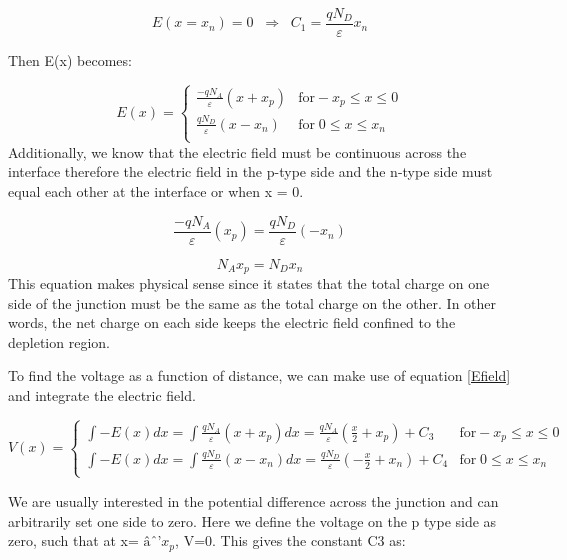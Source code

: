 \begin{equation}
E(x=x_{n})=0  \; \;  \Rightarrow  \;\; C_{1}= \frac{qN_{D}}{\varepsilon}x_{n}
\end{equation}

Then E(x) becomes:

\begin{equation}
E(x) = \begin{cases}
         \frac{-qN_{A}}{\varepsilon}(x+x_{p}) & \text{for}  -x_{p}\leq x \leq 0 \\
         \frac{qN_{D}}{\varepsilon}(x-x_{n})  &  \text{for} \; 0 \leq x \leq x_{n}  \\
     \end{cases}
\end{equation}
 Additionally, we know that the electric field must be continuous across the interface therefore the electric field in the p-type side and the n-type side must equal each other at the interface or when x = 0. 

\begin{equation}
\frac{-qN_{A}}{\varepsilon}(x_{p})=\frac{qN_{D}}{\varepsilon}(-x_{n})
\end{equation}

\begin{equation}
N_{A}x_{p}=N_{D}x_{n}
\label{NAeqND}
\end{equation}This equation makes physical sense since it states that the total charge on one side of the junction must be the same as the total charge on the other. In other words, the net charge on each side keeps the electric field confined to the depletion region.

To find the voltage as a function of distance, we can make use of equation \ref{Efield} and integrate the electric field.

\begin{equation}
V(x) = \begin{cases}
       \int -E(x)dx=\int \frac{qN_{A}}{\varepsilon}(x+x_{p}) dx = \frac{qN_{A}}{\varepsilon}(\frac{x}{2}+x_{p})+ C_{3} & \text{for}  -x_{p}\leq x \leq 0 \\
       \int -E(x)dx=\int \frac{qN_{D}}{\varepsilon}(x-x_{n}) dx = \frac{qN_{D}}{\varepsilon}(-\frac{x}{2}+x_{n})+ C_{4}  &  \text{for} \; 0 \leq x \leq x_{n}  \\
     \end{cases}
\end{equation}

We are usually interested in the potential difference across the junction and can arbitrarily set one side to zero. Here we define the voltage on the p type side as zero, such that at x= $âˆ’x_p$, V=0. This gives the constant C3 as:


